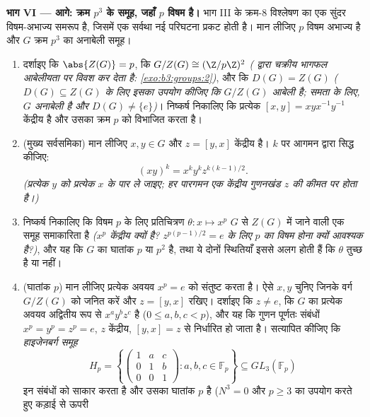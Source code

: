 \begin{problem}
\medskip
\noindent\textbf{भाग VI --- आगे: क्रम $p^3$ के समूह, जहाँ
$p$ विषम है।} भाग III के क्रम-$8$ विश्लेषण का एक सुंदर
विषम-अभाज्य समरूप है, जिसमें एक सर्वथा नई परिघटना प्रकट होती है।
मान लीजिए $p$ विषम अभाज्य है और $G$ क्रम $p^3$ का अनाबेली
समूह।
\begin{enumerate}[resume]
  \item दर्शाइए कि $\abs{Z(G)} = p$, कि $G/Z(G) \cong
        (\Z/p\Z)^2$ \emph{( द्वारा चक्रीय
        भागफल आबेलीयता पर विवश कर देता है: \cref{exo:b3:groups:2})}, और कि
        $D(G) =
        Z(G)$ \emph{($D(G) \subseteq Z(G)$ के लिए इसका उपयोग कीजिए कि $G/Z(G)$
        आबेली है; समता के लिए, $G$ अनाबेली है और $D(G) \neq \{e\}$)}।
        निष्कर्ष निकालिए कि प्रत्येक  $[x, y] = xyx^{-1}y^{-1}$
        केंद्रीय है और उसका क्रम $p$ को विभाजित करता है।
  \item (मुख्य सर्वसमिका) मान लीजिए $x, y \in G$ और $z = [y, x]$ केंद्रीय
        है। $k$ पर आगमन द्वारा सिद्ध कीजिए:
        \[
        (xy)^k = x^k y^k z^{k(k-1)/2} .
        \]
        \emph{(प्रत्येक $y$ को प्रत्येक $x$ के पार ले
        जाइए; हर पारगमन एक केंद्रीय गुणनखंड $z$ की कीमत पर
        होता है।)}
  \item निष्कर्ष निकालिए कि विषम $p$ के लिए प्रतिचित्रण $\theta\colon x \mapsto
        x^p$
        $G$ से $Z(G)$ में जाने वाली एक समूह समाकारिता है
        \emph{($x^p$ केंद्रीय क्यों है? $z^{p(p-1)/2} = e$ के लिए $p$
        का विषम होना क्यों आवश्यक है?)}, और यह कि $G$ का
        घातांक $p$ या $p^2$ है, तथा ये दोनों स्थितियाँ इससे
        अलग होती हैं कि $\theta$ तुच्छ है या नहीं।
  \item (घातांक $p$) मान लीजिए प्रत्येक अवयव $x^p = e$ को संतुष्ट
        करता है। ऐसे $x, y$ चुनिए जिनके वर्ग $G/Z(G)$ को जनित करें
        और $z =
        [y, x]$ रखिए। दर्शाइए कि $z \neq e$, कि $G$ का प्रत्येक
        अवयव अद्वितीय रूप से $x^ay^bz^c$ है ($0 \leq a, b, c < p$), और यह कि गुणन
        पूर्णतः संबंधों $x^p = y^p = z^p = e$, $z$ केंद्रीय, $[y, x] =
        z$ से
        निर्धारित हो जाता है। सत्यापित कीजिए कि \emph{हाइजेनबर्ग
        समूह}
        \[
        H_p = \left\{
        \begin{pmatrix} 1 & a & c\\ 0 & 1 & b\\ 0 & 0 & 1
        \end{pmatrix} : a, b, c \in \mathbb F_p \right\}
        \subseteq GL_3(\mathbb F_p)
        \]
        इन संबंधों को साकार करता है और उसका घातांक $p$ है
        ($N^3 = 0$ और $p \geq 3$ का उपयोग करते हुए कड़ाई से ऊपरी

\end{enumerate}
\end{problem}
